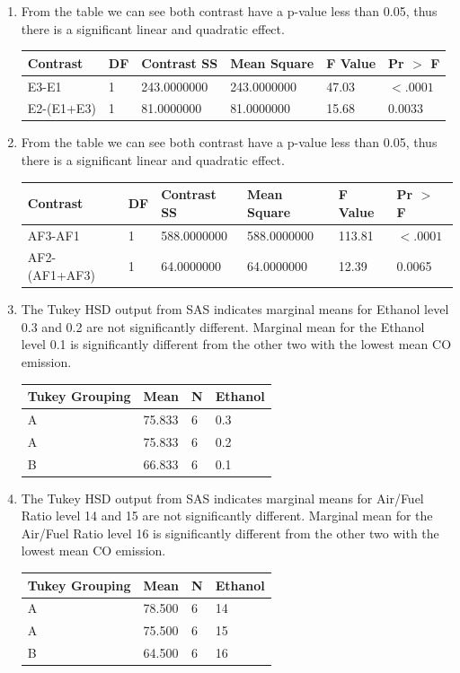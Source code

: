 \documentclass{article}
\begin{document}
\begin{enumerate}[leftmargin = 0 em, label = \arabic*., font = \bfseries]
\begin{enumerate}
\item From the table we can see both contrast have a p-value less than 0.05, thus there is a significant linear and quadratic effect.

\begin{tabular}{llllll}
\toprule
Contrast&DF&Contrast SS&Mean Square&F Value&Pr $>$ F\\
\midrule
E3-E1&1&243.0000000&243.0000000&47.03&$<.0001$\\
E2-(E1+E3)&1&81.0000000&81.0000000&15.68&$0.0033$\\
\bottomrule
\end{tabular}

\item From the table we can see both contrast have a p-value less than 0.05, thus there is a significant linear and quadratic effect.

\begin{tabular}{llllll}
\toprule
Contrast&DF&Contrast SS&Mean Square&F Value&Pr $>$ F\\
\midrule
AF3-AF1&1&588.0000000&588.0000000&113.81&$<.0001$\\
AF2-(AF1+AF3)&1&64.0000000&64.0000000&12.39&0.0065\\
\bottomrule
\end{tabular}


\item The Tukey HSD output from SAS indicates marginal means for Ethanol level 0.3 and 0.2 are not significantly different. Marginal mean for the Ethanol level 0.1 is significantly different from the other two with the lowest mean CO emission.
\begin{center}
	\begin{tabular}{llll}
	\toprule
Tukey Grouping&Mean&N&Ethanol\\
\midrule
A&75.833&6&0.3\\
A&75.833&6&0.2\\
B&66.833&6&0.1\\
\bottomrule
	\end{tabular}
\end{center}

\item The Tukey HSD output from SAS indicates marginal means for Air/Fuel Ratio level 14 and 15 are not significantly different. Marginal mean for the Air/Fuel Ratio level 16 is significantly different from the other two with the lowest mean CO emission.
\begin{center}
	\begin{tabular}{llll}
	\toprule
Tukey Grouping&Mean&N&Ethanol\\
\midrule
A&78.500&6&14\\
A&75.500&6&15\\
B&64.500&6&16\\
\bottomrule
	\end{tabular}
\end{center}



\end{enumerate}
\end{enumerate}
\end{document}
